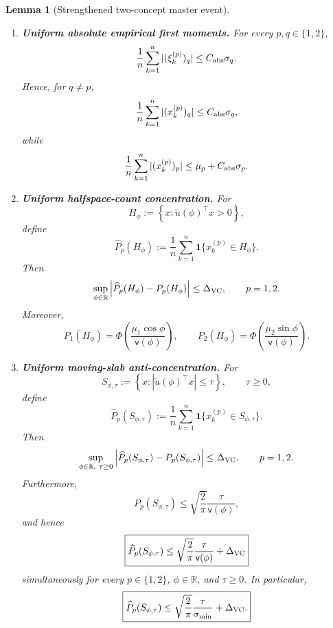 \documentclass{article} %
\theoremstyle{plain}
\newtheorem{lemma}[theorem]{Lemma}
\theoremstyle{definition}
\theoremstyle{remark}
\begin{document}
\begin{lemma}[Strengthened two-concept master event]
\begin{enumerate}[label=(\roman*),leftmargin=2.4em]
\item
\textbf{Uniform absolute empirical first moments.}
For every $p,q\in\{1,2\}$,
\[
\frac1n
\sum_{k=1}^n
|(\xi_k^{(p)})_q|
\le
C_{\rm abs}\sigma_q.
\]
Hence, for $q\neq p$,
\[
\frac1n
\sum_{k=1}^n
|(x_k^{(p)})_q|
\le
C_{\rm abs}\sigma_q,
\]
while
\[
\frac1n
\sum_{k=1}^n
|(x_k^{(p)})_p|
\le
\mu_p+C_{\rm abs}\sigma_p.
\]

\item
\textbf{Uniform halfspace-count concentration.}
For
\[
H_\phi
:=
\left\{
x:
\widetilde u(\phi)^\top x>0
\right\},
\]
define
\[
\widehat P_p(H_\phi)
:=
\frac1n
\sum_{k=1}^n
\mathbf 1\{
x_k^{(p)}\in H_\phi
\}.
\]
Then
\[
\sup_{\phi\in\mathbb R}
\left|
\widehat P_p(H_\phi)
-
P_p(H_\phi)
\right|
\le
\Delta_{\rm VC},
\qquad
p=1,2.
\]
Moreover,
\[
P_1(H_\phi)
=
\Phi\!\left(
\frac{\mu_1\cos\phi}{\mathsf v(\phi)}
\right),
\qquad
P_2(H_\phi)
=
\Phi\!\left(
\frac{\mu_2\sin\phi}{\mathsf v(\phi)}
\right).
\]

\item
\textbf{Uniform moving-slab anti-concentration.}
For
\[
S_{\phi,\tau}
:=
\left\{
x:
\left|
\widetilde u(\phi)^\top x
\right|
\le\tau
\right\},
\qquad
\tau\ge0,
\]
define
\[
\widehat P_p(S_{\phi,\tau})
:=
\frac1n
\sum_{k=1}^n
\mathbf 1\{
x_k^{(p)}\in S_{\phi,\tau}
\}.
\]
Then
\[
\sup_{\phi\in\mathbb R,\ \tau\ge0}
\left|
\widehat P_p(S_{\phi,\tau})
-
P_p(S_{\phi,\tau})
\right|
\le
\Delta_{\rm VC},
\qquad
p=1,2.
\]
Furthermore,
\[
P_p(S_{\phi,\tau})
\le
\sqrt{\frac2\pi}
\frac{\tau}{\mathsf v(\phi)},
\]
and hence
\[
\boxed{
\widehat P_p(S_{\phi,\tau})
\le
\sqrt{\frac2\pi}
\frac{\tau}{\mathsf v(\phi)}
+
\Delta_{\rm VC}
}
\]
simultaneously for every $p\in\{1,2\}$,
$\phi\in\mathbb R$, and $\tau\ge0$.
In particular,
\[
\boxed{
\widehat P_p(S_{\phi,\tau})
\le
\sqrt{\frac2\pi}
\frac{\tau}{\sigma_{\min}}
+
\Delta_{\rm VC}.
}
\]

\end{enumerate}
\end{lemma}
\end{document}
